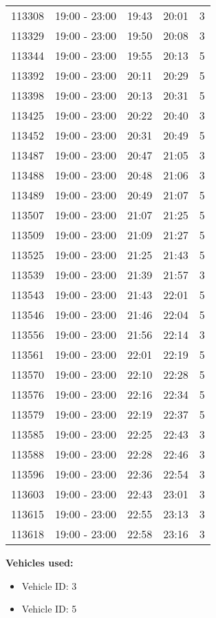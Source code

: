 \documentclass{article}
\begin{document}
\begin{tabular}{llccc}
113308 & 19:00 - 23:00 & 19:43 & 20:01 & 3 \\
113329 & 19:00 - 23:00 & 19:50 & 20:08 & 3 \\
113344 & 19:00 - 23:00 & 19:55 & 20:13 & 5 \\
113392 & 19:00 - 23:00 & 20:11 & 20:29 & 5 \\
113398 & 19:00 - 23:00 & 20:13 & 20:31 & 5 \\
113425 & 19:00 - 23:00 & 20:22 & 20:40 & 3 \\
113452 & 19:00 - 23:00 & 20:31 & 20:49 & 5 \\
113487 & 19:00 - 23:00 & 20:47 & 21:05 & 3 \\
113488 & 19:00 - 23:00 & 20:48 & 21:06 & 3 \\
113489 & 19:00 - 23:00 & 20:49 & 21:07 & 5 \\
113507 & 19:00 - 23:00 & 21:07 & 21:25 & 5 \\
113509 & 19:00 - 23:00 & 21:09 & 21:27 & 5 \\
113525 & 19:00 - 23:00 & 21:25 & 21:43 & 5 \\
113539 & 19:00 - 23:00 & 21:39 & 21:57 & 3 \\
113543 & 19:00 - 23:00 & 21:43 & 22:01 & 5 \\
113546 & 19:00 - 23:00 & 21:46 & 22:04 & 5 \\
113556 & 19:00 - 23:00 & 21:56 & 22:14 & 3 \\
113561 & 19:00 - 23:00 & 22:01 & 22:19 & 5 \\
113570 & 19:00 - 23:00 & 22:10 & 22:28 & 5 \\
113576 & 19:00 - 23:00 & 22:16 & 22:34 & 5 \\
113579 & 19:00 - 23:00 & 22:19 & 22:37 & 5 \\
113585 & 19:00 - 23:00 & 22:25 & 22:43 & 3 \\
113588 & 19:00 - 23:00 & 22:28 & 22:46 & 3 \\
113596 & 19:00 - 23:00 & 22:36 & 22:54 & 3 \\
113603 & 19:00 - 23:00 & 22:43 & 23:01 & 3 \\
113615 & 19:00 - 23:00 & 22:55 & 23:13 & 3 \\
113618 & 19:00 - 23:00 & 22:58 & 23:16 & 3 \\
\bottomrule
\end{tabular}

\textbf{Vehicles used:}
\begin{itemize}
  \item Vehicle ID: 3
  \item Vehicle ID: 5
\end{itemize}
\end{document}

